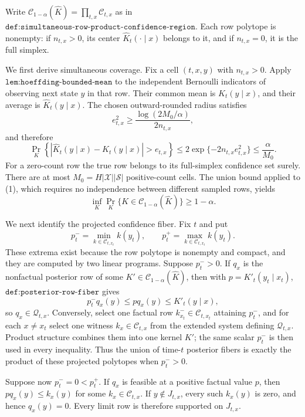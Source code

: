 Write \(\mathcal C_{1-\alpha}(\widehat K)=\prod_{t,x}\mathcal C_{t,x}\) as in \(\texttt{def:simultaneous-row-product-confidence-region}\).  Each row polytope is nonempty: if \(n_{t,x}>0\), its center \(\widehat K_t(\cdot\mid x)\) belongs to it, and if \(n_{t,x}=0\), it is the full simplex.

We first derive simultaneous coverage.  Fix a cell \((t,x,y)\) with \(n_{t,x}>0\).  Apply \(\texttt{lem:hoeffding-bounded-mean}\) to the independent Bernoulli indicators of observing next state \(y\) in that row.  Their common mean is \(K_t(y\mid x)\), and their average is \(\widehat K_t(y\mid x)\).  The chosen outward-rounded radius satisfies
\[
 e_{t,x}^2\ge \frac{\log(2M_0/\alpha)}{2n_{t,x}},
\]
and therefore
\[
 \Pr_K\left\{\left|\widehat K_t(y\mid x)-K_t(y\mid x)\right|>e_{t,x}\right\}
 \le 2\exp\{-2n_{t,x}e_{t,x}^2\}
 \le \frac{\alpha}{M_0}. \tag{1}
\]
For a zero-count row the true row belongs to its full-simplex confidence set surely.  There are at most \(M_0=H|\mathcal X||\mathcal S|\) positive-count cells.  The union bound applied to (1), which requires no independence between different sampled rows, yields
\[
 \inf_K\Pr_K\{K\in\mathcal C_{1-\alpha}(\widehat K)\}\ge1-\alpha. \tag{2}
\]

We next identify the projected confidence fiber.  Fix \(t\) and put
\[
 p_t^- =\min_{k\in\mathcal C_{t,x_t}}k(y_t),
 \qquad p_t^+=\max_{k\in\mathcal C_{t,x_t}}k(y_t). \tag{3}
\]
These extrema exist because the row polytope is nonempty and compact, and they are computed by two linear programs.  Suppose \(p_t^->0\).  If \(q_x\) is the nonfactual posterior row of some \(K'\in\mathcal C_{1-\alpha}(\widehat K)\), then with \(p=K'_t(y_t\mid x_t)\), \(\texttt{def:posterior-row-fiber}\) gives
\[
 p_t^-q_x(y)\le p q_x(y)\le K'_t(y\mid x), \tag{4}
\]
so \(q_x\in\mathcal Q_{t,x}\).  Conversely, select one factual row \(k_{x_t}^-\in\mathcal C_{t,x_t}\) attaining \(p_t^-\), and for each \(x\ne x_t\) select one witness \(k_x\in\mathcal C_{t,x}\) from the extended system defining \(\mathcal Q_{t,x}\).  Product structure combines them into one kernel \(K'\); the same scalar \(p_t^-\) is then used in every inequality.  Thus the union of time-\(t\) posterior fibers is exactly the product of these projected polytopes when \(p_t^->0\).

Suppose now \(p_t^-=0<p_t^+\).  If \(q_x\) is feasible at a positive factual value \(p\), then \(p q_x(y)\le k_x(y)\) for some \(k_x\in\mathcal C_{t,x}\).  If \(y\notin J_{t,x}\), every such \(k_x(y)\) is zero, and hence \(q_x(y)=0\).  Every limit row is therefore supported on \(J_{t,x}\).


